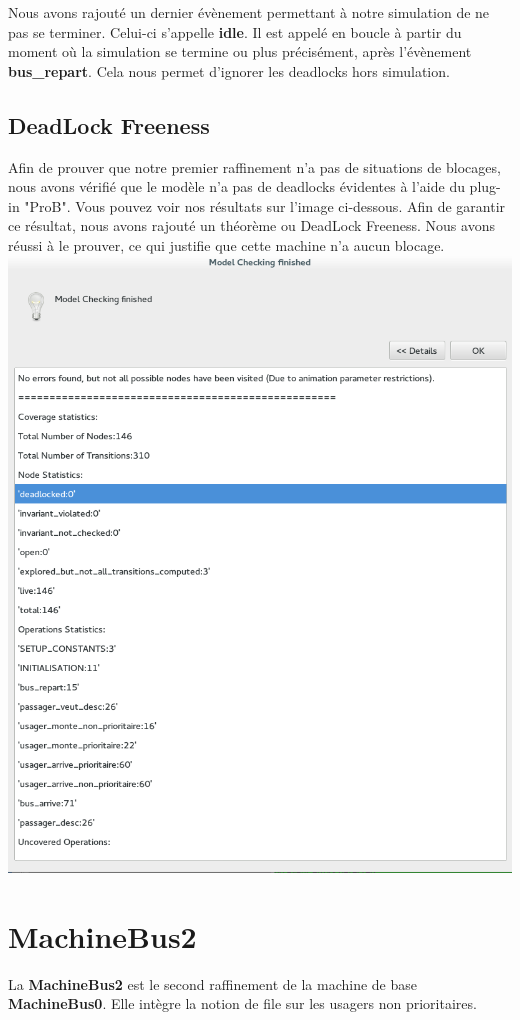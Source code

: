 \documentclass[a4paper,titlepage]{report}
\begin{document}
		Nous avons rajouté un dernier évènement permettant à notre simulation de ne pas se terminer. Celui-ci s'appelle \textbf{idle}. Il est appelé en boucle à partir du moment où la simulation se termine ou plus précisément, après l'évènement \textbf{bus\_repart}. Cela nous permet d'ignorer les deadlocks hors simulation. 
		
		

\subsection{DeadLock Freeness}
	Afin de prouver que notre premier raffinement n'a pas de situations	de blocages, nous avons vérifié que le modèle n'a pas de deadlocks évidentes à l'aide du plug-in "ProB". Vous pouvez voir nos résultats sur l'image ci-dessous. Afin de garantir ce résultat, nous avons rajouté un théorème ou DeadLock Freeness. Nous avons réussi à le prouver, ce qui justifie que cette machine n'a aucun blocage. \\
	
	\includegraphics[width=\textwidth]{checkMachineBus1.png}
	
	
\section{MachineBus2}	
	La \textbf{MachineBus2} est le second raffinement de la machine de base \textbf{MachineBus0}. Elle intègre la notion de file sur les usagers non prioritaires.\\
	
	
	
		
\end{document}

